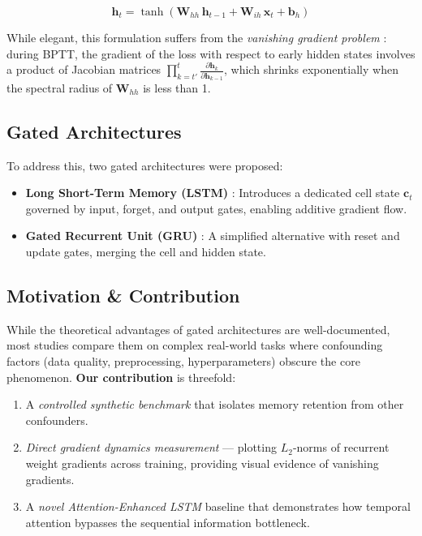 \documentclass[12pt, a4paper]{article}
\begin{document}
\begin{equation}
    \mathbf{h}_t = \tanh(\mathbf{W}_{hh}\,\mathbf{h}_{t-1} + \mathbf{W}_{ih}\,\mathbf{x}_t + \mathbf{b}_h)
    \label{eq:rnn}
\end{equation}

While elegant, this formulation suffers from the \textit{vanishing gradient problem} \cite{bengio1994, hochreiter1991}: during BPTT, the gradient of the loss with respect to early hidden states involves a product of Jacobian matrices $\prod_{k=t'}^{t} \frac{\partial \mathbf{h}_k}{\partial \mathbf{h}_{k-1}}$, which shrinks exponentially when the spectral radius of $\mathbf{W}_{hh}$ is less than 1.

\subsection{Gated Architectures}

To address this, two gated architectures were proposed:

\begin{itemize}[leftmargin=2em]
    \item \textbf{Long Short-Term Memory (LSTM)} \cite{hochreiter1997}: Introduces a dedicated cell state $\mathbf{c}_t$ governed by input, forget, and output gates, enabling additive gradient flow.
    \item \textbf{Gated Recurrent Unit (GRU)} \cite{cho2014}: A simplified alternative with reset and update gates, merging the cell and hidden state.
\end{itemize}

\subsection{Motivation \& Contribution}

While the theoretical advantages of gated architectures are well-documented, most studies compare them on complex real-world tasks where confounding factors (data quality, preprocessing, hyperparameters) obscure the core phenomenon. \textbf{Our contribution} is threefold:

\begin{enumerate}[leftmargin=2em]
    \item A \textit{controlled synthetic benchmark} that isolates memory retention from other confounders.
    \item \textit{Direct gradient dynamics measurement} — plotting $L_2$-norms of recurrent weight gradients across training, providing visual evidence of vanishing gradients.
    \item A \textit{novel Attention-Enhanced LSTM} baseline that demonstrates how temporal attention bypasses the sequential information bottleneck.
\end{enumerate}
\end{document}
